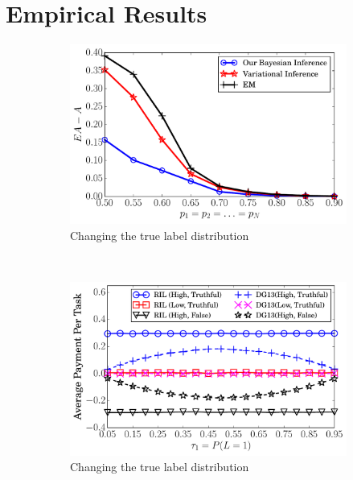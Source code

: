 \documentclass{article}
\begin{document}
\section{Empirical Results}

\begin{figure}[t]
    \centering
        \begin{subfigure}[t]{0.24\textwidth}
        \centering
        \includegraphics[width=\textwidth]{image/EXPC1}
        \caption{\label{BPP1}Changing the true label distribution}
    \end{subfigure}
    ~
    \begin{subfigure}[t]{0.24\textwidth}
        \centering
        \includegraphics[width=\textwidth]{image/BPP1}
        \caption{\label{BPP1}Changing the true label distribution}
    \end{subfigure}%
    ~
    \begin{subfigure}[t]{0.24\textwidth}
        \centering

\end{subfigure}
\end{figure}
\end{document}
